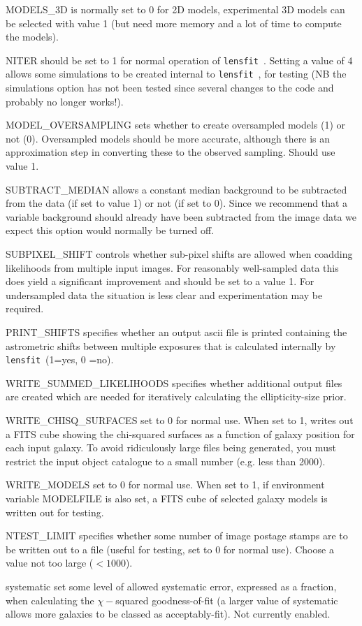 \documentclass{article}
\def\lensfit{{\tt lensfit}\ }
\begin{document}
\begin{list}{}{\itemsep=0mm \leftmargin=5mm}
\item MODELS\_3D is normally set to 0 for 2D models, experimental 3D models can be selected with value 1 (but
need more memory and a lot of time to compute the models). 
\item NITER should be set to 1 for normal operation of \lensfit. Setting a value of 4 allows some simulations 
to be created internal to \lensfit, for testing (NB the simulations option has not been tested since several 
changes to the code and probably no longer works!). 
\item MODEL\_OVERSAMPLING sets whether to create oversampled models (1) or not (0).  Oversampled models
should be more accurate, although there is an approximation step in converting these to the observed
sampling.  Should use value 1.
\item SUBTRACT\_MEDIAN allows a constant median background to be subtracted from the data (if set to 
value 1) or not (if set to 0). Since we recommend that a variable background should already have been 
subtracted from the image data we expect this option would normally be turned off. 
\item SUBPIXEL\_SHIFT controls whether sub-pixel shifts are allowed when coadding likelihoods from multiple 
input images. For reasonably well-sampled data this does yield a significant improvement and should be 
set to a value 1. For undersampled data the situation is less clear and experimentation may be required. 
\item PRINT\_SHIFTS specifies whether an output ascii file is printed containing the astrometric shifts between 
multiple exposures that is calculated internally by \lensfit (1=yes, 0 =no). 
\item WRITE\_SUMMED\_LIKELIHOODS specifies whether additional output files are created which are needed 
for iteratively calculating the ellipticity-size prior. 
\item WRITE\_CHISQ\_SURFACES set to 0 for normal use.  When set to 1, writes out a FITS cube showing the
chi-squared surfaces as a function of galaxy position for each input galaxy.  To avoid ridiculously large
files being generated, you must restrict the input object catalogue to a small number (e.g. less than 2000).
\item WRITE\_MODELS set to 0 for normal use.  When set to 1, if environment variable MODELFILE is also set,
a FITS cube of selected galaxy models is written out for testing.
\item NTEST\_LIMIT specifies whether some number of image postage stamps are to be written out to a file 
(useful for testing, set to 0 for normal use).  Choose a value not too large ($<1000$).
\item systematic set some level of allowed systematic error, expressed as a fraction, when calculating the
$\chi-$squared goodness-of-fit (a larger value of systematic allows more galaxies to be classed as acceptably-fit).
Not currently enabled.
\end{list}
\end{document}
